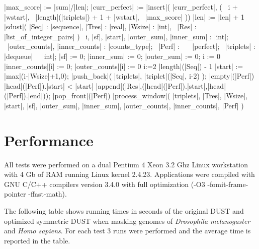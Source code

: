 \documentclass{article}
\newcommand{\OF}{\ \keyword{of}\ }
\newcommand{\VARP}{\keyword{var}\ }
\newcommand{\LIST}{\keyword{list}\ }
\begin{document}
\begin{program}
                \THEN |max_score| := |sum|/|len|;
                      |curr_perfect| := |insert|(
                          \qquad|curr_perfect|,
                          \qquad(
                          \qquad\ \quad i + |wstart|,
                          \qquad\ \quad|length|(|triplets|) + 1 + |wstart|,
                          \qquad\ \quad|max_score|
                          \qquad))
                \FI
            \FI
            |len| := |len| + 1
        \OD
    \FI
    \END
\ENDPROC
\PROC |sdust|(
    \tab |Seq|       : |sequence|,
         |Tres|      : |real|,
         |Wsize|     : |int|,
         \VARP |Res| : |list_of_integer_pairs| )\untab\BODY
    \BEGIN
    \VARP i, |sf|, |start|, |outer_sum|, |inner_sum| : |int|;
    \VARP |outer_counts|, |inner_counts|             : |counts_type|;
    \VARP |Perf|                                     : \LIST \OF |perfect|;
    \VARP |triplets|                                 : |dequeue| \OF |int|;
    |sf|        := 0;
    |inner_sum| := 0;
    |outer_sum| := 0;
    \FOR i := 0  \DO
        |inner_counts|[i] := 0;
        |outer_counts|[i] := 0
    \OD
    \FOR i:=2 \TO |length|(|Seq|) - 1 \DO
        |start|        := |max|(i-|Wsize|+1,0);
        |push_back|( |triplets|, |triplet|(|Seq|, i-2) );
        \WHILE \NOT |empty|(|Perf|) \AND |head|(|Perf|).|start| < |start| \DO
            |append|(|Res|,(|head|(|Perf|).|start|,|head|(|Perf|).|end|));
            |pop_front|(|Perf|)
        \OD
        |process_window|( |triplets|, |Tres|, |Wsize|, |start|, |sf|, 
        \qquad |outer_sum|, |inner_sum|, |outer_counts|, |inner_counts|, |Perf| )
    \OD
    \END
\ENDPROC
\END
\end{program}

\section{Performance}

All tests were performed on a dual Pentium 4 Xeon 3.2 Ghz
Linux workstation with 4 Gb of RAM running Linux kernel 2.4.23.
Applications were compiled with GNU C/C++ compilers 
version 3.4.0 with full optimization (-O3 -fomit-frame-pointer -ffast-math).

The following table shows running times in seconds of the original DUST
and optimized symmetric DUST when masking genomes of {\it Drosophila melanogaster}
and {\it Homo sapiens}.
For each test 3 runs were performed and the average time is reported
in the table.
\end{document}
